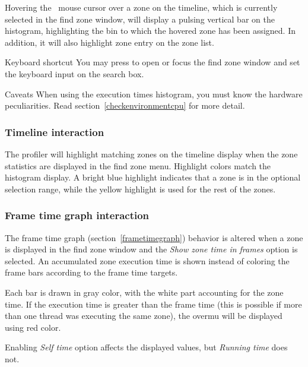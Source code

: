 \documentclass[hidelinks,titlepage,a4paper,twoside]{article}
\begin{document}
Hovering the \faMousePointer{}~mouse cursor over a zone on the timeline, which is currently selected in the find zone window, will display a pulsing vertical bar on the histogram, highlighting the bin to which the hovered zone has been assigned. In addition, it will also highlight zone entry on the zone list.

\begin{bclogo}[
noborder=true,
couleur=black!5,
logo=\bclampe
]{Keyboard shortcut}
You may press  to open or focus the find zone window and set the keyboard input on the search box.
\end{bclogo}

\begin{bclogo}[
noborder=true,
couleur=black!5,
logo=\bcattention
]{Caveats}
When using the execution times histogram, you must know the hardware peculiarities. Read section~\ref{checkenvironmentcpu} for more detail.
\end{bclogo}

\subsubsection{Timeline interaction}

The profiler will highlight matching zones on the timeline display when the zone statistics are displayed in the find zone menu. Highlight colors match the histogram display. A bright blue highlight indicates that a zone is in the optional selection range, while the yellow highlight is used for the rest of the zones.

\subsubsection{Frame time graph interaction}
\label{frametimefindzone}

The frame time graph (section~\ref{frametimegraph}) behavior is altered when a zone is displayed in the find zone window and the \emph{Show zone time in frames} option is selected. An accumulated zone execution time is shown instead of coloring the frame bars according to the frame time targets.

Each bar is drawn in gray color, with the white part accounting for the zone time. If the execution time is greater than the frame time (this is possible if more than one thread was executing the same zone), the overmu will be displayed using red color.

Enabling \emph{Self time} option affects the displayed values, but \emph{Running time} does not.
\end{document}
